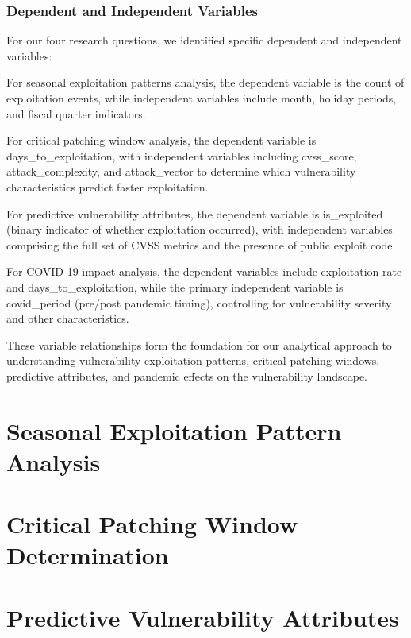 \documentclass[runningheads]{llncs}
\begin{document}
\subsubsection{Dependent and Independent Variables}
For our four research questions, we identified specific dependent and independent variables:

For seasonal exploitation patterns analysis, the dependent variable is the count of exploitation events, while independent variables include month, holiday periods, and fiscal quarter indicators.

For critical patching window analysis, the dependent variable is days\_to\_exploitation, with independent variables including cvss\_score, attack\_complexity, and attack\_vector to determine which vulnerability characteristics predict faster exploitation.

For predictive vulnerability attributes, the dependent variable is is\_exploited (binary indicator of whether exploitation occurred), with independent variables comprising the full set of CVSS metrics and the presence of public exploit code.

For COVID-19 impact analysis, the dependent variables include exploitation rate and days\_to\_exploitation, while the primary independent variable is covid\_period (pre/post pandemic timing), controlling for vulnerability severity and other characteristics.

These variable relationships form the foundation for our analytical approach to understanding vulnerability exploitation patterns, critical patching windows, predictive attributes, and pandemic effects on the vulnerability landscape.


\section{Seasonal Exploitation Pattern Analysis}

\section{Critical Patching Window Determination}

\section{Predictive Vulnerability Attributes}
\end{document}
